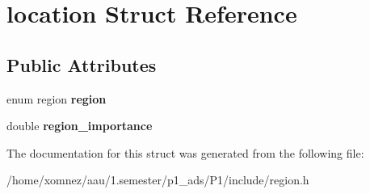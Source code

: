 \hypertarget{structlocation}{}\section{location Struct Reference}
\label{structlocation}
\subsection*{Public Attributes}
\begin{DoxyCompactItemize}
\item 
\mbox{\label{structlocation_af54050de86e43d08d5363d06ef198f5d}} 
enum region {\bfseries region}
\item 
\mbox{\label{structlocation_a0e3caadd47e7634ceece3ad4c37419f5}} 
double {\bfseries region\+\_\+importance}
\end{DoxyCompactItemize}


The documentation for this struct was generated from the following file\+:\begin{DoxyCompactItemize}
\item 
/home/xomnez/aau/1.\+semester/p1\+\_\+ads/\+P1/include/region.\+h\end{DoxyCompactItemize}
